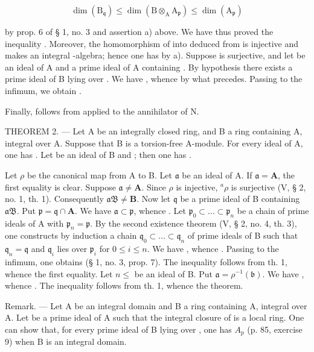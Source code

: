 \[
\dim (\mathrm{B} _ {\mathfrak {q}}) \leqslant \dim (\mathrm{B} \otimes_ {\mathrm{A}} \mathrm{A} _ {\mathfrak {p}}) \leqslant \dim (\mathrm{A} _ {\mathfrak {p}})
\]

by prop. 6 of § 1, no. 3 and assertion a) above. We have thus proved the inequality . Moreover, the homomorphism of  into  deduced from  is injective and makes  an integral -algebra; hence one has  by a). Suppose  is surjective, and let  be an ideal of A and  a prime ideal of A containing . By hypothesis there exists a prime ideal  of B lying over . We have , whence  by what precedes. Passing to the infimum, we obtain .

Finally,  follows from  applied to the annihilator  of N.

THEOREM 2. --- Let A be an integrally closed ring, and B a ring containing A, integral over A. Suppose that B is a torsion-free A-module. For every ideal  of A, one has . Let  be an ideal of B and ; then one has .

Let \(\rho\) be the canonical map from A to B. Let \(\mathfrak{a}\) be an ideal of A. If \(\mathfrak{a} = \mathbf{A}\), the first equality is clear. Suppose \(\mathfrak{a} \neq \mathbf{A}\). Since \(\rho\) is injective, \({}^{a}\rho\) is surjective (V, § 2, no. 1, th. 1). Consequently \(\mathfrak{aB} \neq \mathbf{B}\). Now let \(\mathfrak{q}\) be a prime ideal of B containing \(\mathfrak{aB}\). Put \(\mathfrak{p} = \mathfrak{q} \cap \mathbf{A}\). We have \(\mathfrak{a} \subset \mathfrak{p}\), whence . Let \(\mathfrak{p}_0 \subset \ldots \subset \mathfrak{p}_n\) be a chain of prime ideals of A with \(\mathfrak{p}_n = \mathfrak{p}\). By the second existence theorem (V, § 2, no. 4, th. 3), one constructs by induction a chain \(\mathfrak{q}_0 \subset \ldots \subset \mathfrak{q}_n\) of prime ideals of B such that \(\mathfrak{q}_n = \mathfrak{q}\) and \(\mathfrak{q}_i\) lies over \(\mathfrak{p}_i\) for \(0 \leqslant i \leqslant n\). We have , whence . Passing to the infimum, one obtains  (§ 1, no. 3, prop. 7). The inequality  follows from th. 1, whence the first equality. Let \(n \leqslant\) be an ideal of B. Put \(\mathfrak{a} = \rho^{-1}(\mathfrak{b})\). We have , whence . The inequality  follows from th. 1, whence the theorem.

Remark. --- Let A be an integral domain and B a ring containing A, integral over A. Let  be a prime ideal of A such that the integral closure of  is a local ring. One can show that, for every prime ideal  of B lying over , one has \(A_{p}\) (p. 85, exercise 9) when B is an integral domain.

